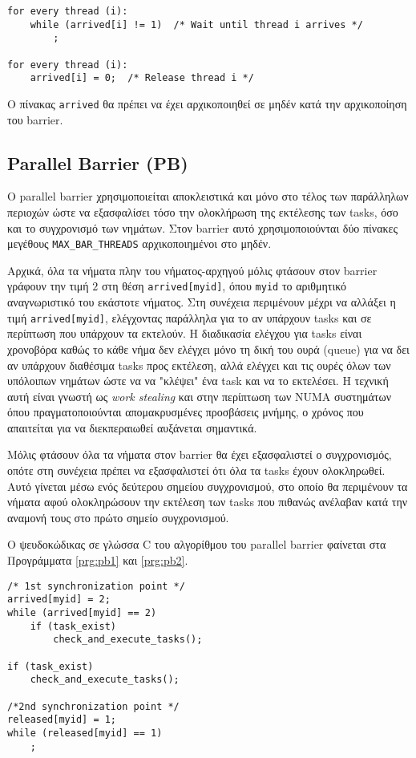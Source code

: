 \begin{lstlisting}[label=prg:bsc2, caption=Απλός barrier για όλα τα νήματα πλην του νήματος-αρχηγού.]
for every thread (i):
    while (arrived[i] != 1)  /* Wait until thread i arrives */
        ;
        
for every thread (i):
    arrived[i] = 0;  /* Release thread i */
\end{lstlisting}

Ο πίνακας \texttt{arrived} θα πρέπει να έχει αρχικοποιηθεί σε μηδέν κατά την αρχικοποίηση του barrier.


\subsection{Parallel Barrier (PB)}
Ο parallel barrier χρησιμοποιείται αποκλειστικά και μόνο στο τέλος των παράλληλων περιοχών ώστε να εξασφαλίσει τόσο την ολοκλήρωση της εκτέλεσης των tasks, όσο και το συγχρονισμό των νημάτων. Στον barrier αυτό χρησιμοποιούνται δύο πίνακες μεγέθους \texttt{MAX\_BAR\_THREADS} αρχικοποιημένοι στο μηδέν.

Αρχικά, όλα τα νήματα πλην του νήματος-αρχηγού μόλις φτάσουν στον barrier γράφουν την τιμή $2$ στη θέση \texttt{arrived[myid]}, όπου \texttt{myid} το αριθμητικό αναγνωριστικό του εκάστοτε νήματος. Στη συνέχεια περιμένουν μέχρι να αλλάξει η τιμή \texttt{arrived[myid]}, ελέγχοντας παράλληλα για το αν υπάρχουν tasks και σε περίπτωση που υπάρχουν τα εκτελούν. Η διαδικασία ελέγχου για tasks είναι χρονοβόρα καθώς το κάθε νήμα δεν ελέγχει μόνο τη δική του ουρά (queue) για να δει αν υπάρχουν διαθέσιμα tasks προς εκτέλεση, αλλά ελέγχει και τις ουρές όλων των υπόλοιπων νημάτων ώστε να να "κλέψει" ένα task και να το εκτελέσει. Η τεχνική αυτή είναι γνωστή ως \textit{work stealing} και στην περίπτωση των NUMA συστημάτων όπου πραγματοποιούνται απομακρυσμένες προσβάσεις μνήμης, ο χρόνος που απαιτείται για να διεκπεραιωθεί αυξάνεται σημαντικά.

Μόλις φτάσουν όλα τα νήματα στον barrier θα έχει εξασφαλιστεί ο συγχρονισμός, οπότε στη συνέχεια πρέπει να εξασφαλιστεί ότι όλα τα tasks έχουν ολοκληρωθεί. Αυτό γίνεται μέσω ενός δεύτερου σημείου συγχρονισμού, στο οποίο θα περιμένουν τα νήματα αφού ολοκληρώσουν την εκτέλεση των tasks που πιθανώς ανέλαβαν κατά την αναμονή τους στο πρώτο σημείο συγχρονισμού.

Ο ψευδοκώδικας σε γλώσσα C του αλγορίθμου του parallel barrier φαίνεται στα Προγράμματα \ref{prg:pb1} και \ref{prg:pb2}.

\begin{lstlisting}[label=prg:pb1, caption=Parallel barrier για όλα τα νήματα πλην του νήματος-αρχηγού.]
/* 1st synchronization point */
arrived[myid] = 2;
while (arrived[myid] == 2)
    if (task_exist)
        check_and_execute_tasks();
    
if (task_exist)
    check_and_execute_tasks();
    
/*2nd synchronization point */
released[myid] = 1;
while (released[myid] == 1)
    ;
\end{lstlisting}


